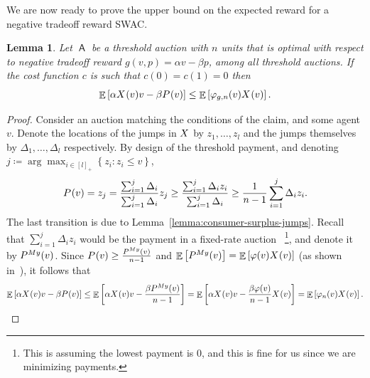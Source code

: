 \documentclass[11pt,letterpaper]{article}
\newcommand{\set}[1]{\left\{#1\right\}}
\newcommand{\sqbr}[1]{\left[ #1 \right]}
\newcommand{\fr}{fixed-rate\xspace}
\newcommand{\swac}{SWAC\xspace}
\DeclareMathOperator*{\E}{\bb{E}}
\newcommand{\psqrrange}[1]{[#1]_+}
\newcommand{\bb}[1]{\mathbb{#1}}
\DeclareMathOperator{\A}{\auc{A}}
\newcommand{\g}{g}
\theoremstyle{plain}
\newtheorem{lemma}[theorem]{Lemma}
\newcommand{\auc}[1]{\mathsf{#1}}
\begin{document}
We are now ready to prove the upper bound on the expected reward for a negative tradeoff reward \swac.
\begin{lemma}\label{lemma:consumer_surplus_virtual_welfare_bounds_reward}
    Let $\A$ be a threshold auction with $n$ units that is optimal with respect to negative tradeoff reward $\g(v,p)=\alpha v-\beta p$, among all threshold auctions.
   If the cost function $c$ is such that $c(0)=c(1)=0$ then
    \begin{equation*}
        \E\sqbr{\alpha\x{v}v-\beta\p{v}}\leq\E\sqbr{\varphi_{\g,n}(v)\x{v}}.
    \end{equation*}
\end{lemma}
\begin{proof}
    Consider an auction matching the conditions of the claim, and some agent $v$. Denote the locations of the jumps in $\alloc$ by $z_1,\dots,z_l$ and the jumps themselves by $\Delta_1,\dots,\Delta_l$ respectively. By design of the threshold payment, and denoting $j\coloneq\arg\max_{i\in\psqrrange{l}}\set{z_i:z_i\leq v}$,
    \begin{align*}
        \p{v}=z_j=\frac{\sum_{i=1}^{j}\Delta_i}{\sum_{i=1}^{j}\Delta_i}z_j\geq\frac{\sum_{i=1}^{j}\Delta_iz_i}{\sum_{i=1}^{j}\Delta_i}\geq\frac{1}{n-1}\sum_{i=1}^{j}\Delta_iz_i.
    \end{align*}
    The last transition is due to Lemma~\ref{lemma:consumer-surplus-jumps}. Recall that $\sum_{i=1}^{j}\Delta_iz_i$ would be the payment in a \fr auction~\cite{myerson1981optimal}
    \footnote{This is assuming the lowest payment is $0$, and this is fine for us since we are minimizing payments.}, and denote it by $\p[My]{v}$. Since $\p{v}\geq\frac{\p[My]{v}}{n-1}$ and $\E\sqbr{\p[My]{v}}=\E\sqbr{\varphi(v)\x{v}}$ (as shown in~\cite{myerson1981optimal}), it follows that
    \begin{align*}
        \E\sqbr{\alpha\x{v}v-\beta\p{v}}\leq\E\sqbr{\alpha\x{v}v-\frac{\beta\p[My]{v}}{n-1}}=\E\sqbr{\alpha\x{v}v-\frac{\beta\varphi(v)}{n-1}\x{v}}=\E\sqbr{\varphi_n(v)\x{v}}.
    \end{align*}
\end{proof}


\end{document}
